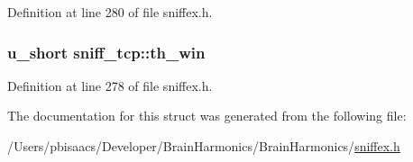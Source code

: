 Definition at line 280 of file sniffex.\+h.

\subsubsection[{\texorpdfstring{th\+\_\+win}{th_win}}]{\setlength{\rightskip}{0pt plus 5cm}u\+\_\+short sniff\+\_\+tcp\+::th\+\_\+win}\hypertarget{structsniff__tcp_ad2e0599bbc042e63260bcd3fd07b55c5}{}\label{structsniff__tcp_ad2e0599bbc042e63260bcd3fd07b55c5}


Definition at line 278 of file sniffex.\+h.



The documentation for this struct was generated from the following file\+:\begin{DoxyCompactItemize}
\item 
/\+Users/pbisaacs/\+Developer/\+Brain\+Harmonics/\+Brain\+Harmonics/\hyperlink{sniffex_8h}{sniffex.\+h}\end{DoxyCompactItemize}
